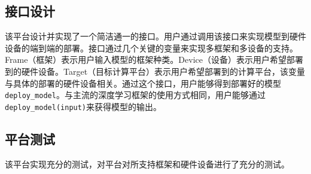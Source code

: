 \subsection{接口设计}

该平台设计并实现了一个简洁通一的接口。用户通过调用该接口来实现模型到硬件设备的端到端的部署。接口通过几个关键的变量来实现多框架和多设备的支持。Frame（框架）表示用户输入模型的框架种类。Device（设备）表示用户希望部署到的硬件设备。Target（目标计算平台）表示用户希望部署到的计算平台，该变量与具体的部署的硬件设备相关。通过这个接口，用户能够得到部署好的模型\verb|deploy_model|。与主流的深度学习框架的使用方式相同，用户能够通过\verb|deploy_model(input)|来获得模型的输出。

\subsection{平台测试}

该平台实现充分的测试，对平台对所支持框架和硬件设备进行了充分的测试。


